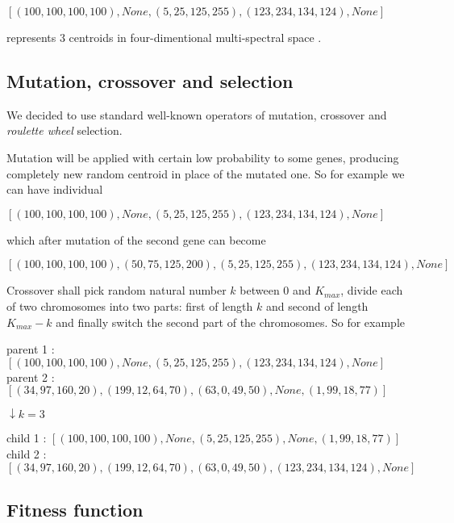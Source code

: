 \documentclass[11pt,leqno]{article}
\theoremstyle{mytheoremstyle}
\theoremstyle{mytheoremstyle}
\begin{document}
\begin{center}
$[(100,100,100,100), None, (5,25,125,255), (123,234,134,124), None]$
\end{center}

\noindent represents 3 centroids in four-dimentional multi-spectral space  .

\subsection{Mutation, crossover and selection}

We decided to use standard well-known operators of mutation, crossover and \textit{roulette wheel} selection. 

Mutation will be applied with certain low probability to some genes, producing completely new random centroid in place of the mutated one. So for example we can have individual

\begin{center}
$[(100,100,100,100), None, (5,25,125,255), (123,234,134,124), None]$
\end{center}

\noindent which after mutation of the second gene can become

\begin{center}
$[(100,100,100,100), (50, 75, 125, 200), (5,25,125,255), (123,234,134,124), None]$
\end{center}

Crossover shall pick random natural number $k$ between 0 and $K_{max}$, divide each of two chromosomes into two parts: first of length $k$ and second of length $K_{max} - k$ and finally switch the second part of the chromosomes. So for example

\begin{center}
parent 1 : $[(100,100,100,100), None, (5,25,125,255), (123,234,134,124), None]$\\
parent 2 : $[(34,97,160,20), (199,12,64,70), (63,0,49,50), None, (1,99,18,77)]$


$\downarrow k = 3$

child 1 : $[(100,100,100,100), None, (5,25,125,255), None, (1,99,18,77)]$\\
child 2 : $[(34,97,160,20), (199,12,64,70), (63,0,49,50), (123,234,134,124), None]$
\end{center}

\subsection{Fitness function}
\end{document}

